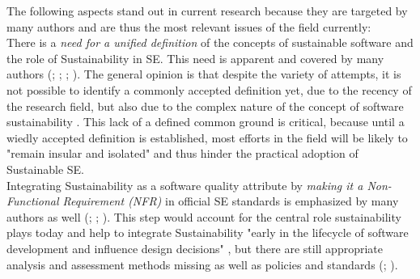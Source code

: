 \documentclass[oribibl]{llncs}
\begin{document}
The following aspects stand out in current research because they are targeted by many authors and are thus the most relevant issues of the field currently:\\
There is a \textit{need for a unified definition} of the concepts of sustainable software and the role of Sustainability in SE. This need is apparent and covered by many authors (\cite{venters_software_2014}; \cite{becker_sustainability_2015}; \cite{calero_green_2015}; \cite{penzenstadler_what_13}). The general opinion is that despite the variety of attempts, it is not possible to identify a commonly accepted definition yet, due to the recency of the research field, but also due to the complex nature of the concept of software sustainability \cite{venters_software_2014}. %
This lack of a defined common ground is critical, because until a wiedly accepted definition is established, most efforts in the field will be likely to "remain insular and isolated" \cite[p.\,5]{venters_software_2014} and thus hinder the practical adoption of Sustainable SE.\\
Integrating Sustainability as a software quality attribute by \textit{making it a Non-Functional Requirement (NFR)} in official SE standards is emphasized by many authors as well (\cite{penzenstadler_safety_2014}; \cite{amsel_toward_2011}; \cite{agarwal_sustainable_2012}). This step would account for the central role sustainability plays today \cite{penzenstadler_safety_2014} and help to integrate Sustainability "early in the lifecycle of software development and influence design decisions" \cite[p.\,2]{raturi_developing_2014}, but there are still appropriate analysis and assessment methods missing as well as policies and standards (\cite{penzenstadler_safety_2014}; \cite{venters_software_2014}).\\ %
\end{document}
